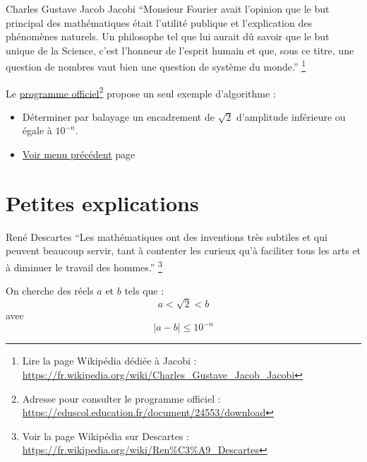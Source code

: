 \documentclass[a4paper,11pt]{book}
\begin{document}
\begin{myquote}{Charles Gustave Jacob Jacobi}
\enquote{Monsieur Fourier avait l'opinion que le but principal des
mathématiques était l'utilité publique et l'explication des
phénomènes naturels. Un philosophe tel que lui aurait dû savoir que
le but unique de la Science, c'est l'honneur de l'esprit humain et
que, sous ce titre, une question de nombres vaut bien une question
de système du monde.}
\footnote{Lire la page Wikipédia dédiée à Jacobi : \url{https://fr.wikipedia.org/wiki/Charles_Gustave_Jacob_Jacobi}}
\end{myquote}


\clearpage

Le \href{https://eduscol.education.fr/document/24553/download}{programme officiel}\footnote{Adresse pour consulter le programme officiel :
\url{https://eduscol.education.fr/document/24553/download}} propose un seul exemple
d'algorithme :

\begin{itemize}
\item Déterminer par balayage un encadrement de \(\sqrt{2}\)
d'amplitude inférieure ou égale à \(10^{-n}\).
\end{itemize}


\begin{itemize}
\item \hyperref[org3aca2a1]{Voir menu précédent}
page~\pageref{page:algos-menu}
\end{itemize}

\clearpage

\chapter{Petites explications}
\label{sec:org08a872d}
\label{org25f4c17}
\label{page:sec5.2explain}

\begin{myquote}{René Descartes}
\enquote{Les mathématiques ont des inventions très subtiles et qui peuvent
beaucoup servir, tant à contenter les curieux qu'à faciliter tous
les arts et à diminuer le travail des hommes.}
\footnote{Voir la page Wikipédia sur Descartes : \url{https://fr.wikipedia.org/wiki/Ren\%C3\%A9_Descartes}}
\end{myquote}


\clearpage

On cherche des réels \(a\) et \(b\) tels que :
\[a < \sqrt{2} < b\]
avec
\[\lvert a - b \rvert \leq 10^{-n}\]
\end{document}
